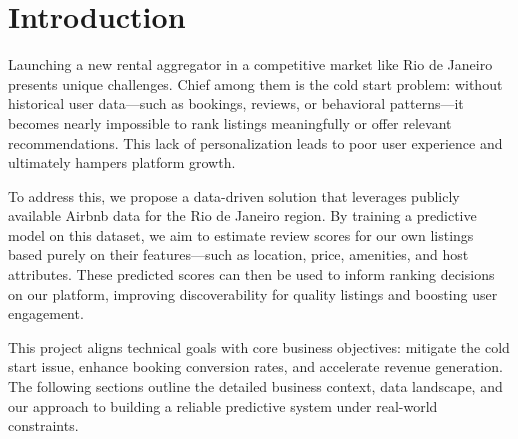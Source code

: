 \section{Introduction}
\label{chap:introduction}

Launching a new rental aggregator in a competitive market like Rio de Janeiro presents unique challenges. Chief among them is the cold start problem: without historical user data—such as bookings, reviews, or behavioral patterns—it becomes nearly impossible to rank listings meaningfully or offer relevant recommendations. This lack of personalization leads to poor user experience and ultimately hampers platform growth.

To address this, we propose a data-driven solution that leverages publicly available Airbnb data for the Rio de Janeiro region. By training a predictive model on this dataset, we aim to estimate review scores for our own listings based purely on their features—such as location, price, amenities, and host attributes. These predicted scores can then be used to inform ranking decisions on our platform, improving discoverability for quality listings and boosting user engagement.

This project aligns technical goals with core business objectives: mitigate the cold start issue, enhance booking conversion rates, and accelerate revenue generation. The following sections outline the detailed business context, data landscape, and our approach to building a reliable predictive system under real-world constraints.

